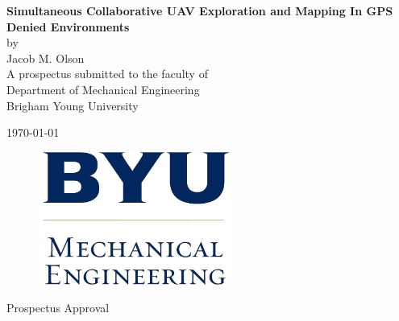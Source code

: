 \documentclass[12pt, letterpaper]{article}
\begin{document}
\begin{titlepage}

\begin{center}

\vspace*{\fill}

\vspace{0.5in}

{ \LARGE \bfseries Simultaneous Collaborative UAV Exploration and Mapping In GPS Denied Environments}\\[.25in]

\large
by\\[.25 in]
Jacob M. Olson\\[1in]

A prospectus submitted to the faculty of\\
Department of Mechanical Engineering\\
Brigham Young University

\vspace{1in}

\today

\vspace*{\fill}

\end{center}

\end{titlepage}

\thispagestyle{empty}

\begin{center}
\vspace*{\fill}

\begin{figure}[htbp] %
   \centering
   \includegraphics[width=2.5in]{byume_logo_clear.jpg} 
\end{figure}

\vspace{0.5in}

\Large{Prospectus Approval}\\[0.5in]

\end{center}
\end{document}
